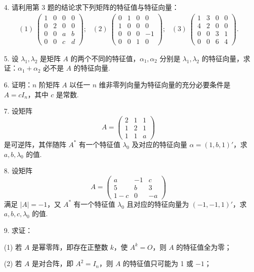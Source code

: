 \documentclass[UTF8, 12pt, fontset=fandol, oneside]{ctexart}
\begin{document}
4. 请利用第 3 题的结论求下列矩阵的特征值与特征向量：
\[
\begin{array}{ccc}
(1)\ \left(\begin{array}{cccc}
1 & 0 & 0 & 0\\
0 & 2 & 0 & 0\\
0 & 0 & a & b\\
0 & 0 & c & d
\end{array}\right);&
(2)\ \left(\begin{array}{cccc}
0 & 1 & 0 & 0\\
1 & 0 & 0 & 0\\
0 & 0 & 0 & -1\\
0 & 0 & 1 & 0
\end{array}\right);&
(3)\ \left(\begin{array}{cccc}
1 & 3 & 0 & 0\\
4 & 2 & 0 & 0\\
0 & 0 & 3 & 1\\
0 & 0 & 6 & 4
\end{array}\right).
\end{array}
\]

5. 设 $\lambda_1,\lambda_2$ 是矩阵 $A$ 的两个不同的特征值，$\alpha_1,\alpha_2$ 分别是 $\lambda_1,\lambda_2$ 的特征向量，求证：$\alpha_1+\alpha_2$ 必不是 $A$ 的特征向量.

6. 证明：$n$ 阶矩阵 $A$ 以任一 $n$ 维非零列向量为特征向量的充分必要条件是 $A=cI_n$，其中 $c$ 是常数.

7. 设矩阵
\[
A=\left(\begin{array}{ccc}
2 & 1 & 1\\
1 & 2 & 1\\
1 & 1 & a
\end{array}\right)
\]
是可逆阵，其伴随阵 $A^*$ 有一个特征值 $\lambda_0$ 及对应的特征向量 $\alpha=(1,b,1)'$，求 $a,b,\lambda_0$ 的值.

8. 设矩阵
\[
A=\left(\begin{array}{ccc}
a & -1 & c\\
5 & b & 3\\
1-c & 0 & -a
\end{array}\right)
\]
满足 $|A|=-1$，又 $A^*$ 有一个特征值 $\lambda_0$ 且对应的特征向量为 $(-1,-1,1)'$，求 $a,b,c,\lambda_0$ 的值.

9. 求证：

(1) 若 $A$ 是幂零阵，即存在正整数 $k$，使 $A^k=O$，则 $A$ 的特征值全为零；

(2) 若 $A$ 是对合阵，即 $A^2=I_n$，则 $A$ 的特征值只可能为 1 或 $-1$；
\end{document}

